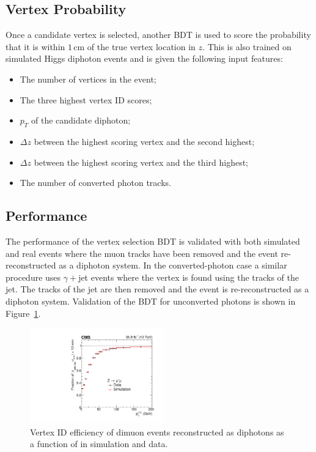 \subsection{Vertex Probability}
Once a candidate vertex is selected, another BDT is used to score the probability that it is within $1$\,cm of the true vertex location in $z$.   
This is also trained on simulated Higgs diphoton events and is given the following input features:
\begin{itemize}[noitemsep]
    \item The number of vertices in the event;
    \item The three highest vertex ID scores;
    \item $p_{T}$ of the candidate diphoton;
    \item $\Delta{z}$ between the highest scoring vertex and the second highest;
    \item $\Delta{z}$ between the highest scoring vertex and the third highest;
    \item The number of converted photon tracks.
\end{itemize}


\subsection{Performance}
The performance of the vertex selection BDT is validated with both simulated and real \Zmumu events where the muon tracks have been removed and the event re-reconstructed as a diphoton system. 
In the converted-photon case a similar procedure uses $\gamma + $jet events where the vertex is found using the tracks of the jet. 
The tracks of the jet are then removed and the event is re-reconstructed as a diphoton system. Validation of the BDT for unconverted photons is shown in Figure~\ref{fig:object_reco:vertex_id_valid}. 
\begin{figure}[h!]
    \centering
    \includegraphics[width=0.52\textwidth]{figures/object_reco/CMS-HIG-16-040_Figure_003.pdf}
    \caption{Vertex ID efficiency of dimuon events reconstructed as diphotons as a function of \pt in simulation and data.}
        \label{fig:object_reco:vertex_id_valid}
\end{figure}

